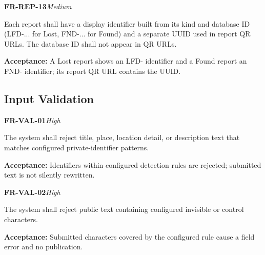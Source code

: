 \documentclass[12pt,a4paper,oneside]{report}
\begin{document}
\noindent\begin{minipage}{\linewidth}\textbf{FR-REP-13}\hfill\textit{Medium}\par\nopagebreak

Each report shall have a display identifier built from its kind and database ID (LFD-... for Lost, FND-... for Found) and a separate UUID used in report QR URLs. The database ID shall not appear in QR URLs.

{\color{muted}\textbf{Acceptance:} A Lost report shows an LFD- identifier and a Found report an FND- identifier; its report QR URL contains the UUID.\par}\end{minipage}\par\vspace{5pt}


\subsection{Input Validation}

\noindent\begin{minipage}{\linewidth}\textbf{FR-VAL-01}\hfill\textit{High}\par\nopagebreak

The system shall reject title, place, location detail, or description text that matches configured private-identifier patterns.

{\color{muted}\textbf{Acceptance:} Identifiers within configured detection rules are rejected; submitted text is not silently rewritten.\par}\end{minipage}\par\vspace{5pt}

\noindent\begin{minipage}{\linewidth}\textbf{FR-VAL-02}\hfill\textit{High}\par\nopagebreak

The system shall reject public text containing configured invisible or control characters.

{\color{muted}\textbf{Acceptance:} Submitted characters covered by the configured rule cause a field error and no publication.\par}\end{minipage}\par\vspace{5pt}
\end{document}
